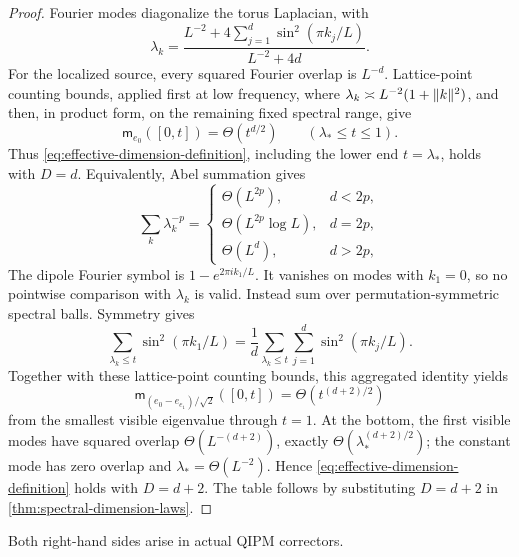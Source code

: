 \begin{proof}
Fourier modes diagonalize the torus Laplacian, with
\[
 \lambda_k=\frac{L^{-2}+4\sum_{j=1}^d\sin^2(\pi k_j/L)}{L^{-2}+4d}.
\]
For the localized source, every squared Fourier overlap is $L^{-d}$.
Lattice-point counting bounds, applied first at low frequency, where
$\lambda_k\asymp L^{-2}(1+\lVert k\rVert^2)$, and then, in product form, on the
remaining fixed spectral range, give
\[
 \mathsf m_{e_0}([0,t])=\Theta(t^{d/2})
 \qquad(\lambda_*\leq t\leq1).
\]
Thus \eqref{eq:effective-dimension-definition}, including the lower end
$t=\lambda_*$, holds with $D=d$.  Equivalently, Abel summation gives
\[
 \sum_k\lambda_k^{-p}=
 \begin{cases}
  \Theta(L^{2p}),&d<2p,\\
  \Theta(L^{2p}\log L),&d=2p,\\
  \Theta(L^d),&d>2p,
 \end{cases}
\]
The dipole Fourier symbol is $1-e^{2\pi i k_1/L}$.  It vanishes on modes
with $k_1=0$, so no pointwise comparison with $\lambda_k$ is valid.  Instead
sum over permutation-symmetric spectral balls.  Symmetry gives
\[
 \sum_{\lambda_k\leq t}\sin^2(\pi k_1/L)
 =\frac1d\sum_{\lambda_k\leq t}\sum_{j=1}^d
       \sin^2(\pi k_j/L).
\]
Together with these lattice-point counting bounds, this aggregated identity yields
\[
 \mathsf m_{(e_0-e_{e_1})/\sqrt2}([0,t])
 =\Theta(t^{(d+2)/2})
\]
from the smallest visible eigenvalue through $t=1$.  At the bottom, the
first visible modes have squared overlap $\Theta(L^{-(d+2)})$, exactly
$\Theta(\lambda_*^{(d+2)/2})$; the constant mode has zero overlap and
$\lambda_*=\Theta(L^{-2})$.  Hence \eqref{eq:effective-dimension-definition}
holds with $D=d+2$.  The table follows by substituting $D=d+2$ in
\cref{thm:spectral-dimension-laws}.
\end{proof}

Both right-hand sides arise in actual QIPM correctors.

